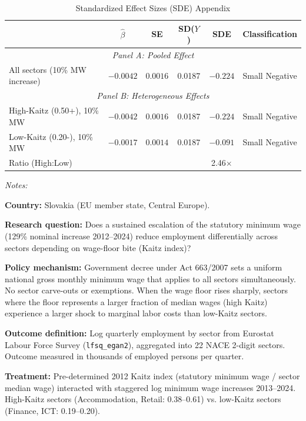 \begin{table}[H]
\centering
\caption{Standardized Effect Sizes (SDE) Appendix}
\label{tab:sde}
\footnotesize
\begin{tabular}{lccccc}
\hline\hline
& $\hat{\beta}$ & SE & SD($Y$) & SDE & Classification \\
\hline
\multicolumn{6}{c}{\textit{Panel A: Pooled Effect}} \\
\hline
All sectors (10\% MW increase) & $-0.0042$ & $0.0016$ & 0.0187 & $-0.224$ & Small Negative \\
\hline
\multicolumn{6}{c}{\textit{Panel B: Heterogeneous Effects}} \\
\hline
High-Kaitz (0.50+), 10\% MW & $-0.0042$ & $0.0016$ & 0.0187 & $-0.224$ & Small Negative \\
Low-Kaitz (0.20-), 10\% MW & $-0.0017$ & $0.0014$ & 0.0187 & $-0.091$ & Small Negative \\
Ratio (High:Low) & & & & 2.46$\times$ & \\
\hline\hline
\end{tabular}

\begin{flushleft}
\small

\textit{Notes:}

\textbf{Country:} Slovakia (EU member state, Central Europe).

\textbf{Research question:} Does a sustained escalation of the statutory minimum wage (129\% nominal increase 2012--2024) reduce employment differentially across sectors depending on wage-floor bite (Kaitz index)?

\textbf{Policy mechanism:} Government decree under Act 663/2007 sets a uniform national gross monthly minimum wage that applies to all sectors simultaneously. No sector carve-outs or exemptions. When the wage floor rises sharply, sectors where the floor represents a larger fraction of median wages (high Kaitz) experience a larger shock to marginal labor costs than low-Kaitz sectors.

\textbf{Outcome definition:} Log quarterly employment by sector from Eurostat Labour Force Survey (\texttt{lfsq\_egan2}), aggregated into 22 NACE 2-digit sectors. Outcome measured in thousands of employed persons per quarter.

\textbf{Treatment:} Pre-determined 2012 Kaitz index (statutory minimum wage / sector median wage) interacted with staggered log minimum wage increases 2013--2024. High-Kaitz sectors (Accommodation, Retail: 0.38--0.61) vs. low-Kaitz sectors (Finance, ICT: 0.19--0.20).


\end{flushleft}
\end{table}
